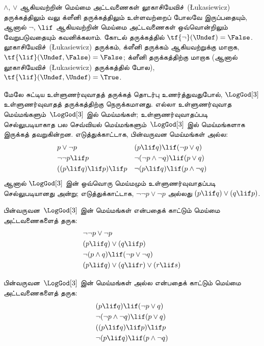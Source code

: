 \documentclass[../../../include/open-logic-section]{subfiles}
\begin{document}
$\land$, $\lor$ ஆகியவற்றின் மெய்மை அட்டவணைகள் லூகாசியேவிச்~(\L ukasiewicz)
தருக்கத்திலும்
வலு க்ளீனி தருக்கத்திலும் உள்ளவற்றைப் போலவே இருப்பதையும், ஆனால் $\lnot$,
$\lif$ ஆகியவற்றின் மெய்மை அட்டவணைகள் ஒவ்வொன்றிலும் வேறுபடுவதையும் கவனிக்கலாம்.
கோடல் தருக்கத்தில் $\tf{\lnot}(\Undef) = \False$.
லூகாசியேவிச்~(\L ukasiewicz) தருக்கம்,
க்ளீனி தருக்கம் ஆகியவற்றுக்கு மாறாக,
$\tf{\lif}(\Undef, \False) = \False$; க்ளீனி தருக்கத்திற்கு மாறாக
(ஆனால் லூகாசியேவிச்~(\L ukasiewicz) தருக்கத்தில் போல),
$\tf{\lif}(\Undef,
\Undef) = \True$.

மேலே சுட்டிய உள்ளுணர்வுவாதத் தருக்கத் தொடர்பு உணர்த்துவதுபோல்,
$\LogGod[3]$ உள்ளுணர்வுவாதத் தருக்கத்திற்கு நெருக்கமானது. எல்லா
உள்ளுணர்வுவாத மெய்மங்களும்~$\LogGod[3]$ இல் மெய்மங்கள்; உள்ளுணர்வுவாதப்படி
செல்லுபடியாகாத பல செவ்வியல் மெய்மங்களும்~$\LogGod[3]$ இல் மெய்மங்களாக
இருக்கத் தவறுகின்றன. எடுத்துக்காட்டாக, பின்வருவன மெய்மங்கள் அல்ல:
\begin{align*}
  & p \lor \lnot p && (p \lif q) \lif (\lnot p \lor q) \\
  & \lnot\lnot p \lif p && \lnot(\lnot p \land \lnot q) \lif (p \lor q) \\
  & ((p \lif q) \lif p) \lif p && \lnot(p \lif q) \lif (p \land \lnot q)
\end{align*}
ஆனால் $\LogGod[3]$ இன் ஒவ்வொரு மெய்மமும் உள்ளுணர்வுவாதப்படி
செல்லுபடியானது அன்று; எடுத்துக்காட்டாக, $\lnot\lnot p \lor \lnot p$ அல்லது
$(p \lif q) \lor (q \lif p)$.

\begin{prob}
  பின்வருவன~$\LogGod[3]$ இன் மெய்மங்கள் என்பதைக் காட்டும் மெய்மை
  அட்டவணைகளைத் தருக:
  \begin{align*}
    & \lnot\lnot p \lor \lnot p\\
    & (p \lif q) \lor (q \lif p) \\
    & \lnot(p \land q) \lif (\lnot p \lor \lnot q) \\
    & (p \lif q) \lor (q \lif r) \lor (r \lif s)
  \end{align*}
\end{prob}

\begin{prob}
  பின்வருவன~$\LogGod[3]$ இன் மெய்மங்கள் அல்ல என்பதைக் காட்டும் மெய்மை
  அட்டவணைகளைத் தருக:
  \begin{align*}
    & (p \lif q) \lif (\lnot p \lor q) \\
    & \lnot(\lnot p \land \lnot q) \lif (p \lor q) \\
    & ((p \lif q) \lif p) \lif p \\
    & \lnot(p \lif q) \lif (p \land \lnot q)
  \end{align*}
\end{prob}
\end{document}
